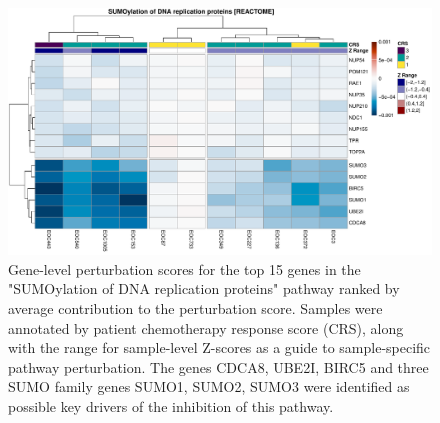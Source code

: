 \documentclass[9pt,a4paper,]{extarticle}
\newenvironment{Shaded}{\begin{snugshade}}{\end{snugshade}}
\newcommand{\AttributeTok}[1]{\textcolor[rgb]{0.13,0.29,0.53}{#1}}
\newcommand{\DecValTok}[1]{\textcolor[rgb]{0.00,0.00,0.81}{#1}}
\newcommand{\FloatTok}[1]{\textcolor[rgb]{0.00,0.00,0.81}{#1}}
\newcommand{\FunctionTok}[1]{\textcolor[rgb]{0.13,0.29,0.53}{\textbf{#1}}}
\newcommand{\NormalTok}[1]{#1}
\newcommand{\SpecialCharTok}[1]{\textcolor[rgb]{0.81,0.36,0.00}{\textbf{#1}}}
\newcommand{\StringTok}[1]{\textcolor[rgb]{0.31,0.60,0.02}{#1}}
\begin{document}
\begin{Shaded}
\end{Shaded}

\begin{figure}[hp]

{\centering \includegraphics[width=1\linewidth]{sSNAPPY_paper_files/figure-latex/Figure7-1} 

}

\caption{Gene-level perturbation scores for the top 15 genes in the "SUMOylation of DNA replication proteins" pathway ranked by average contribution to the perturbation score. Samples were annotated by patient chemotherapy response score (CRS), along with the range for sample-level Z-scores as a guide to sample-specific pathway perturbation. The genes CDCA8, UBE2I, BIRC5 and three SUMO family genes SUMO1, SUMO2, SUMO3 were identified as possible key drivers of the inhibition of this pathway.}\label{fig:Figure7}
\end{figure}
\end{document}
